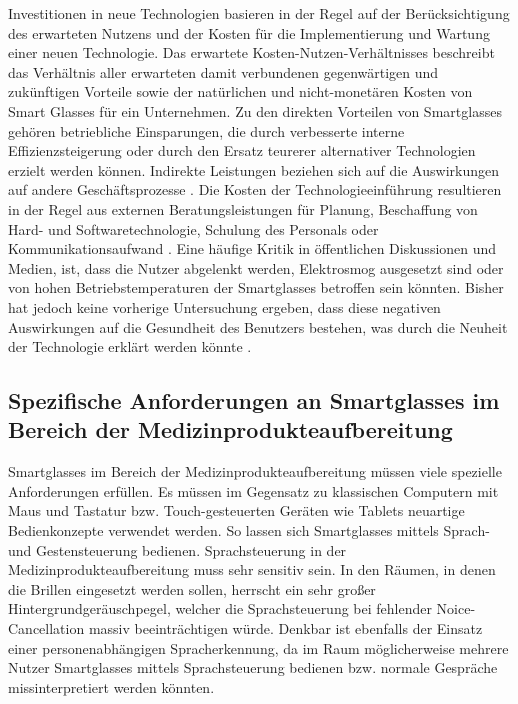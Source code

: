 Investitionen in neue Technologien basieren in der Regel auf der Berücksichtigung des erwarteten Nutzens und der Kosten für die Implementierung und Wartung einer neuen Technologie. Das erwartete Kosten-Nutzen-Verhältnisses beschreibt das Verhältnis aller erwarteten damit verbundenen gegenwärtigen und zukünftigen Vorteile sowie der natürlichen und nicht-monetären Kosten von Smart Glasses für ein Unternehmen. Zu den direkten Vorteilen von Smartglasses gehören betriebliche Einsparungen, die durch verbesserte interne Effizienzsteigerung oder durch den Ersatz teurerer alternativer Technologien erzielt werden können. Indirekte Leistungen beziehen sich auf die Auswirkungen auf andere Geschäftsprozesse \cite{Hein2016}.
Die Kosten der Technologieeinführung resultieren in der Regel aus externen Beratungsleistungen für Planung, Beschaffung von Hard- und Softwaretechnologie, Schulung des Personals oder Kommunikationsaufwand \cite{Hein2016}. Eine häufige Kritik in öffentlichen Diskussionen und Medien, ist, dass die Nutzer abgelenkt werden, Elektrosmog ausgesetzt sind oder von hohen Betriebstemperaturen der Smartglasses betroffen sein könnten. Bisher hat jedoch keine vorherige Untersuchung ergeben, dass diese negativen Auswirkungen auf die Gesundheit des Benutzers bestehen, was durch die Neuheit der Technologie erklärt werden könnte \cite{Hein2016}.
%
%
%
%
%
\subsection{Spezifische Anforderungen an Smartglasses im Bereich der Medizinprodukteaufbereitung}
\label{sec:Spezifische_Anforderungen_an_Smartglasses}
Smartglasses im Bereich der Medizinprodukteaufbereitung müssen viele spezielle Anforderungen erfüllen. Es müssen im Gegensatz zu klassischen Computern mit Maus und Tastatur bzw. Touch-gesteuerten Geräten wie Tablets neuartige Bedienkonzepte verwendet werden. So lassen sich Smartglasses mittels Sprach- und Gestensteuerung bedienen.
Sprachsteuerung in der Medizinprodukteaufbereitung muss sehr sensitiv sein. In den Räumen, in denen die Brillen eingesetzt werden sollen, herrscht ein sehr großer Hintergrundgeräuschpegel, welcher die Sprachsteuerung bei fehlender Noice-Cancellation massiv beeinträchtigen würde. Denkbar ist ebenfalls der Einsatz einer personenabhängigen Spracherkennung, da im Raum möglicherweise mehrere Nutzer Smartglasses mittels Sprachsteuerung bedienen bzw. normale Gespräche missinterpretiert werden könnten. 

